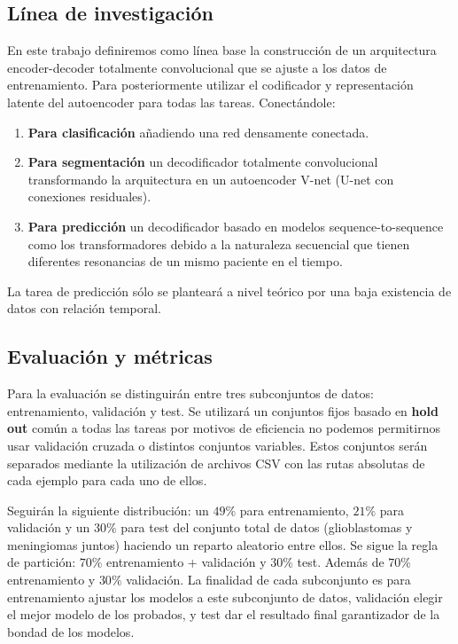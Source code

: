 \subsection{Línea de investigación}

 En este trabajo definiremos como línea base la construcción de un arquitectura encoder-decoder totalmente convolucional que se ajuste a los datos de entrenamiento. Para posteriormente utilizar el codificador y representación latente del autoencoder para todas las tareas. Conectándole:
 
 \begin{enumerate}
 	\item \textbf{Para clasificación} añadiendo una red densamente conectada. 
 	\item \textbf{Para segmentación}  un decodificador totalmente convolucional transformando la arquitectura en un autoencoder V-net (U-net con conexiones residuales).
 	\item \textbf{Para predicción} un decodificador basado en modelos sequence-to-sequence como los transformadores debido a la naturaleza secuencial que tienen diferentes resonancias de un mismo paciente en el tiempo.
 	
 \end{enumerate}
 
 La tarea de predicción sólo se planteará a nivel teórico por una baja existencia de datos con relación temporal. 

\subsection{Evaluación y métricas}

Para la evaluación se distinguirán entre tres subconjuntos de datos: entrenamiento, validación y test. Se utilizará un conjuntos fijos basado en \textbf{hold out} común a todas las tareas por motivos de eficiencia no podemos permitirnos usar validación cruzada o distintos conjuntos variables. Estos conjuntos serán separados mediante la utilización de archivos CSV con las rutas absolutas de cada ejemplo para cada uno de ellos. 

Seguirán la siguiente distribución: un $49 \%$ para entrenamiento, $21 \%$ para validación y un $30 \%$ para test del conjunto total de datos (glioblastomas y meningiomas juntos) haciendo un reparto aleatorio entre ellos. Se sigue la regla de partición: $70 \%$ entrenamiento + validación y $30 \%$ test. Además de $70 \%$ entrenamiento y $30 \%$ validación. La finalidad de cada subconjunto es para entrenamiento ajustar los modelos a este subconjunto de datos, validación elegir el mejor modelo de los probados, y test dar el resultado final garantizador de la bondad de los modelos.


